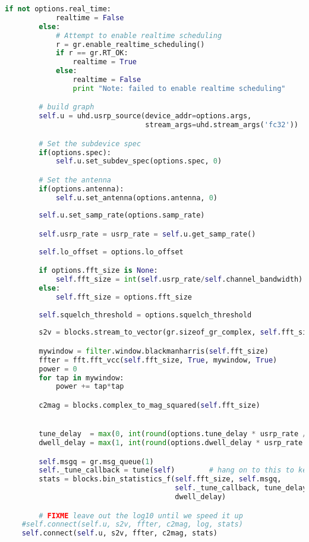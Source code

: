 \begin{lstlisting}[language=Python]
        if not options.real_time:
            realtime = False
        else:
            # Attempt to enable realtime scheduling
            r = gr.enable_realtime_scheduling()
            if r == gr.RT_OK:
                realtime = True
            else:
                realtime = False
                print "Note: failed to enable realtime scheduling"

        # build graph
        self.u = uhd.usrp_source(device_addr=options.args,
                                 stream_args=uhd.stream_args('fc32'))

        # Set the subdevice spec
        if(options.spec):
            self.u.set_subdev_spec(options.spec, 0)

        # Set the antenna
        if(options.antenna):
            self.u.set_antenna(options.antenna, 0)
        
        self.u.set_samp_rate(options.samp_rate)

        self.usrp_rate = usrp_rate = self.u.get_samp_rate()
        
        self.lo_offset = options.lo_offset

        if options.fft_size is None:
            self.fft_size = int(self.usrp_rate/self.channel_bandwidth)
        else:
            self.fft_size = options.fft_size
        
        self.squelch_threshold = options.squelch_threshold
        
        s2v = blocks.stream_to_vector(gr.sizeof_gr_complex, self.fft_size)

        mywindow = filter.window.blackmanharris(self.fft_size)
        ffter = fft.fft_vcc(self.fft_size, True, mywindow, True)
        power = 0
        for tap in mywindow:
            power += tap*tap

        c2mag = blocks.complex_to_mag_squared(self.fft_size)


        tune_delay  = max(0, int(round(options.tune_delay * usrp_rate / self.fft_size)))  # in fft_frames
        dwell_delay = max(1, int(round(options.dwell_delay * usrp_rate / self.fft_size))) # in fft_frames

        self.msgq = gr.msg_queue(1)
        self._tune_callback = tune(self)        # hang on to this to keep it from being GC'd
        stats = blocks.bin_statistics_f(self.fft_size, self.msgq,
                                        self._tune_callback, tune_delay,
                                        dwell_delay)

        # FIXME leave out the log10 until we speed it up
	#self.connect(self.u, s2v, ffter, c2mag, log, stats)
	self.connect(self.u, s2v, ffter, c2mag, stats)


\end{lstlisting}
